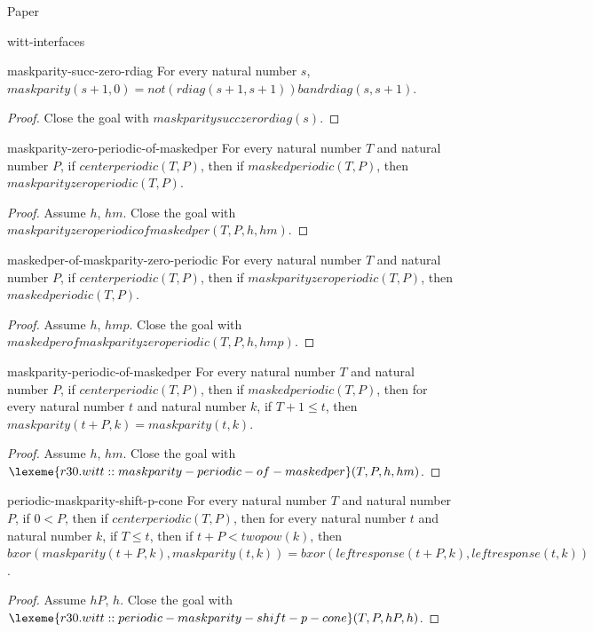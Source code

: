\begin{lexlean}{Paper}
\begin{section}{witt-interfaces}
  \begin{theorem}{maskparity-succ-zero-rdiag}
  For every natural number \(s\), \(maskparity(s + 1, 0) = not(rdiag(s + 1, s + 1)) band rdiag(s, s + 1)\).
  \begin{proof}
  Close the goal with \(maskparitysucczerordiag(s)\).
  \end{proof}
  \end{theorem}

  \begin{theorem}{maskparity-zero-periodic-of-maskedper}
  For every natural number \(T\) and natural number \(P\), if \(centerperiodic(T, P)\), then if \(maskedperiodic(T, P)\), then \(maskparityzeroperiodic(T, P)\).
  \begin{proof}
  Assume \(h\), \(hm\).
  Close the goal with \(maskparityzeroperiodicofmaskedper(T, P, h, hm)\).
  \end{proof}
  \end{theorem}

  \begin{theorem}{maskedper-of-maskparity-zero-periodic}
  For every natural number \(T\) and natural number \(P\), if \(centerperiodic(T, P)\), then if \(maskparityzeroperiodic(T, P)\), then \(maskedperiodic(T, P)\).
  \begin{proof}
  Assume \(h\), \(hmp\).
  Close the goal with \(maskedperofmaskparityzeroperiodic(T, P, h, hmp)\).
  \end{proof}
  \end{theorem}

  \begin{theorem}{maskparity-periodic-of-maskedper}
  For every natural number \(T\) and natural number \(P\), if \(centerperiodic(T, P)\), then if \(maskedperiodic(T, P)\), then for every natural number \(t\) and natural number \(k\), if \(T + 1 ≤ t\), then \(maskparity(t + P, k) = maskparity(t, k)\).
  \begin{proof}
  Assume \(h\), \(hm\).
  Close the goal with \(\lexeme{r30.witt::maskparity-periodic-of-maskedper}(T, P, h, hm)\).
  \end{proof}
  \end{theorem}

  \begin{theorem}{periodic-maskparity-shift-p-cone}
  For every natural number \(T\) and natural number \(P\), if \(0 < P\), then if \(centerperiodic(T, P)\), then for every natural number \(t\) and natural number \(k\), if \(T ≤ t\), then if \(t + P < twopow(k)\), then \(bxor(maskparity(t + P, k), maskparity(t, k)) = bxor(leftresponse(t + P, k), leftresponse(t, k))\).
  \begin{proof}
  Assume \(hP\), \(h\).
  Close the goal with \(\lexeme{r30.witt::periodic-maskparity-shift-p-cone}(T, P, hP, h)\).
  \end{proof}
  \end{theorem}


\end{section}
\end{lexlean}
